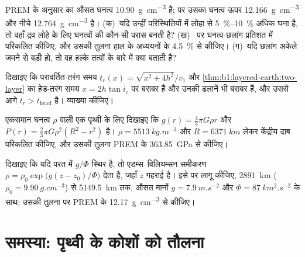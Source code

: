 \begin{exercise}[$\star\star$]\label{exo:b1:layered-earth:9}
PREM के अनुसार  का औसत घनत्व \qty{10.90}{g.cm^{-3}} है;  पर उसका घनत्व ऊपर \qty{12.166}{g.cm^{-3}} और नीचे \qty{12.764}{g.cm^{-3}} है। (क)~यदि उन्हीं परिस्थितियों में लोहा  से \qtyrange{5}{10}{\percent} अधिक घना है, तो वहाँ द्रव लोहे के लिए घनत्वों की कौन-सी परास बनती है? (ख)~ पर घनत्व-छलांग प्रतिशत में परिकलित कीजिए, और उसकी तुलना हाल के अध्ययनों के \qty{4.5}{\percent} से कीजिए। (ग)~यदि छलांग अकेले जमने से बड़ी हो, तो वह हल्के तत्वों के बारे में क्या बताती है?
\end{exercise}

\begin{exercise}[$\star\star\star$]\label{exo:b1:layered-earth:10}
दिखाइए कि परावर्तित-तरंग समय $t_r(x) = \sqrt{x^2 + 4h^2}/v_1$ और \cref{thm:b1:layered-earth:two-layer} का हेड-तरंग समय $x = 2h\tan i_c$ पर बराबर हैं और उनकी ढलानें भी बराबर हैं, और उससे आगे $t_r > t_{\text{head}}$ है। व्याख्या कीजिए।
\end{exercise}

\begin{exercise}[$\star\star\star$]\label{exo:b1:layered-earth:11}
एकसमान घनत्व $\rho$ वाली एक पृथ्वी के लिए दिखाइए कि $g(r) = \tfrac43\pi G\rho r$ और $P(r) = \tfrac23\pi G\rho^2(R^2 - r^2)$ है। $\rho = \qty{5513}{kg.m^{-3}}$ और $R = \qty{6371}{km}$ लेकर केंद्रीय दाब परिकलित कीजिए, और उसकी तुलना PREM के \qty{363.85}{GPa} से कीजिए।
\end{exercise}

\begin{exercise}[$\star\star\star$]\label{exo:b1:layered-earth:12}
दिखाइए कि यदि परत में $g/\Phi$ स्थिर है, तो एडम्स–विलियम्सन समीकरण $\rho = \rho_0\exp\bigl(g(z - z_0)/\Phi\bigr)$ देता है, जहाँ $z$ गहराई है। इसे  पर लागू कीजिए, \qty{2891}{km} ($\rho_0 =
\qty{9.90}{g.cm^{-3}}$) से \qty{5149.5}{km} तक, औसत मानों $g = \qty{7.9}{m.s^{-2}}$ और $\Phi = \qty{87}{km^2.s^{-2}}$ के साथ; उसकी तुलना  पर PREM के \qty{12.17}{g.cm^{-3}} से कीजिए।
\end{exercise}

\section{समस्या: पृथ्वी के कोशों को तौलना}


